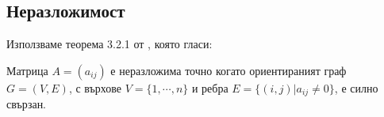 
\subsection{Неразложимост}
Използваме теорема 3.2.1 от \cite{Brualdi1991}, която гласи:
\begin{theorem}
  \label{theorem:ConnectedIrreducability}
  Матрица $A=(a_{ij})$ е неразложима точно когато ориентираният граф $G=(V,E)$, с върхове $V=\{1, \cdots, n\}$ и ребра $E=\{(i,j) \vert a_{ij} \neq 0 \}$, е силно свързан.
\end{theorem}

